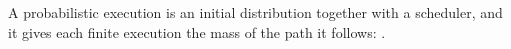 \begin{definition}
  \label{def:probexec}
  \leanok
  A probabilistic execution is an initial distribution together with a scheduler, and it gives each finite execution the mass of the path it follows: .
\end{definition}
